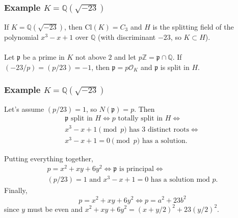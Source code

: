 \documentclass{beamer}
\newcommand{\Cl}{\mathrm{Cl}}
\newcommand{\QQ}{\mathbb{Q}}
\newcommand{\ZZ}{\mathbb{Z}}
\newcommand{\pp}{\mathfrak{p}}
\theoremstyle{plain}
\begin{document}
\begin{frame}[fragile]
    \frametitle{Example $K=\QQ(\sqrt{-23})$}
    If $K=\QQ(\sqrt{-23})$, then $\Cl(K)=C_3$ and $H$ is the splitting field of the polynomial $x^3-x+1$ over $\QQ$ (with discriminant $-23$, so $K\subset H$). \pause
    \\~\\
    Let $\pp$ be a prime in $K$ not above $2$ and let $p\ZZ=\pp\cap\QQ$. If $(-23/p)=(p/23)=-1$, then $\pp=p\mathcal{O}_K$ and $\pp$ is split in $H$. \pause

    \begin{figure}[!ht]
        \centering
    \end{figure}
    
\end{frame}


\begin{frame}
    \frametitle{Example $K=\QQ(\sqrt{-23})$}
    Let's assume $(p/23)=1$, so $N(\pp)=p$. \pause Then
    \begin{align*}
        \pp \text{ split in }H\iff p\text{ totally split in }H\iff \\
        x^3-x+1\pmod{p}\text{ has 3 distinct roots}\iff\\
        x^3-x+1=0\pmod{p}\text{ has a solution.}
    \end{align*} 
    \pause

    Putting everything together, 
    \begin{align*}
        p=x^2+xy+6y^2\iff \pp\text{ is principal}\iff\\
        \text{$(p/23)=1$ and $x^3-x+1=0$ has a solution mod $p$}.
    \end{align*}
    \pause 
    Finally, 
    $$p=x^2+xy+6y^2\iff p=a^2+23b^2$$
    since $y$ must be even and $x^2+xy+6y^2=(x+y/2)^2+23(y/2)^2$.
\end{frame}
\end{document}
